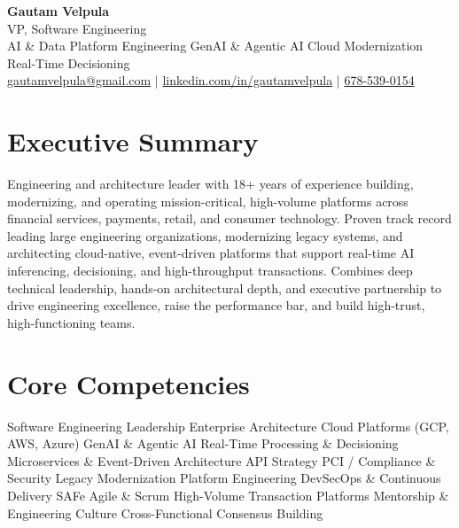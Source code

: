 \documentclass[11pt]{article}
\begin{document}
\begin{center}
    {\LARGE \textbf{Gautam Velpula}} \\[4pt]
    VP, Software Engineering \\[6pt]
    AI \& Data Platform Engineering \textbullet{} GenAI \& Agentic AI \textbullet{} Cloud Modernization \textbullet{} Real-Time Decisioning \\[6pt]
    \href{mailto:gautamvelpula@gmail.com}{gautamvelpula@gmail.com} \;|\;
    \href{https://www.linkedin.com/in/gautamvelpula}{linkedin.com/in/gautamvelpula} \;|\;
    \href{tel:6785390154}{678-539-0154}
\end{center}

\vspace{8pt}

\section*{Executive Summary}
Engineering and architecture leader with 18+ years of experience building, modernizing, and operating mission-critical, high-volume platforms across financial services, payments, retail, and consumer technology. Proven track record leading large engineering organizations, modernizing legacy systems, and architecting cloud-native, event-driven platforms that support real-time AI inferencing, decisioning, and high-throughput transactions. Combines deep technical leadership, hands-on architectural depth, and executive partnership to drive engineering excellence, raise the performance bar, and build high-trust, high-functioning teams.

\section*{Core Competencies}
Software Engineering Leadership \textbullet{} Enterprise Architecture \textbullet{} Cloud Platforms (GCP, AWS, Azure) \textbullet{} GenAI \& Agentic AI \textbullet{} Real-Time Processing \& Decisioning \textbullet{} Microservices \& Event-Driven Architecture \textbullet{} API Strategy \textbullet{} PCI / Compliance \& Security \textbullet{} Legacy Modernization \textbullet{} Platform Engineering \textbullet{} DevSecOps \& Continuous Delivery \textbullet{} SAFe Agile \& Scrum \textbullet{} High-Volume Transaction Platforms \textbullet{} Mentorship \& Engineering Culture \textbullet{} Cross-Functional Consensus Building
\end{document}
